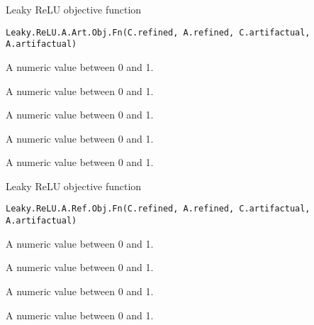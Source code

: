 \documentclass[letterpaper]{book}
\begin{document}
%
\begin{Description}\relax
Leaky ReLU objective function
\end{Description}
%
\begin{Usage}
\begin{verbatim}
Leaky.ReLU.A.Art.Obj.Fn(C.refined, A.refined, C.artifactual, A.artifactual)
\end{verbatim}
\end{Usage}
%
\begin{Arguments}
\begin{ldescription}
\item[\code{C.refined}] A numeric value between 0 and 1.

\item[\code{A.refined}] A numeric value between 0 and 1.

\item[\code{C.artifactual}] A numeric value between 0 and 1.

\item[\code{A.artifactual}] A numeric value between 0 and 1.
\end{ldescription}
\end{Arguments}
%
\begin{Value}
A numeric value between 0 and 1.
\end{Value}
%
\begin{Description}\relax
Leaky ReLU objective function
\end{Description}
%
\begin{Usage}
\begin{verbatim}
Leaky.ReLU.A.Ref.Obj.Fn(C.refined, A.refined, C.artifactual, A.artifactual)
\end{verbatim}
\end{Usage}
%
\begin{Arguments}
\begin{ldescription}
\item[\code{C.refined}] A numeric value between 0 and 1.

\item[\code{A.refined}] A numeric value between 0 and 1.

\item[\code{C.artifactual}] A numeric value between 0 and 1.

\item[\code{A.artifactual}] A numeric value between 0 and 1.
\end{ldescription}
\end{Arguments}
\end{document}
